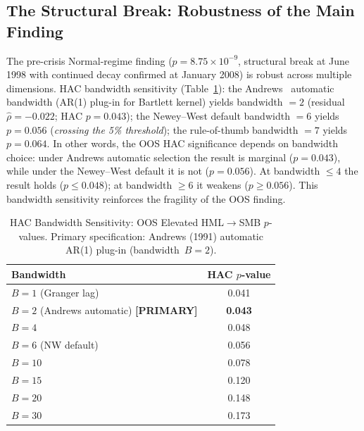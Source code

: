 \documentclass[sigconf,anonymous]{acmart}
\begin{document}
\subsection{The Structural Break: Robustness of the Main Finding}
\label{sec:robustness}

The pre-crisis Normal-regime finding ($p = 8.75 \times 10^{-9}$, structural
break at June 1998 with continued decay confirmed at January 2008) is robust across multiple dimensions.
HAC bandwidth sensitivity (Table~\ref{tab:bandwidth_sensitivity}): the
Andrews~\cite{andrews1991heteroskedasticity} automatic bandwidth
(AR(1) plug-in for Bartlett kernel) yields bandwidth $= 2$
(residual $\hat{\rho} = -0.022$; HAC $p = 0.043$);
the Newey--West default bandwidth $= 6$ yields $p = 0.056$
(\emph{crossing the 5\% threshold}); the rule-of-thumb bandwidth $= 7$
yields $p = 0.064$.
In other words, the OOS HAC significance depends on bandwidth choice:
under Andrews automatic selection the result is marginal ($p = 0.043$),
while under the Newey--West default it is not ($p = 0.056$).
At bandwidth $\leq 4$ the result holds ($p \leq 0.048$); at bandwidth
$\geq 6$ it weakens ($p \geq 0.056$). This bandwidth sensitivity
reinforces the fragility of the OOS finding.

\begin{table}[t]
\centering
\caption{HAC Bandwidth Sensitivity: OOS Elevated HML$\to$SMB $p$-values.
Primary specification: Andrews (1991) automatic AR(1) plug-in (bandwidth~$B = 2$).}
\label{tab:bandwidth_sensitivity}
\small
\begin{tabular}{@{}lc@{}}
\toprule
Bandwidth & HAC $p$-value \\
\midrule
$B = 1$ (Granger lag) & 0.041 \\
$B = 2$ (Andrews automatic) \textbf{[PRIMARY]} & \textbf{0.043} \\
$B = 4$ & 0.048 \\
$B = 6$ (NW default) & 0.056 \\
$B = 10$ & 0.078 \\
$B = 15$ & 0.120 \\
$B = 20$ & 0.148 \\
$B = 30$ & 0.173 \\
\bottomrule
\end{tabular}
\end{table}
\end{document}
